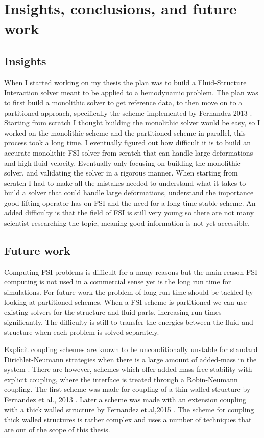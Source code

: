 \chapter{Insights, conclusions, and future work}
\section{Insights}
When I started working on my thesis the plan was to build a Fluid-Structure Interaction solver meant to be applied to a hemodynamic problem. The plan was to first build a monolithic solver to get reference data, to then move on to a partitioned approach, specifically the scheme implemented by Fernandez 2013 \cite{Fernandez2013}. Starting from scratch I thought building the monolithic solver would be easy, so I worked on the monolithic scheme and the partitioned scheme in parallel, this process took a long time. I eventually figured out how difficult it is to build an accurate monolithic FSI solver from scratch that can handle large deformations and high fluid velocity. Eventually only focusing on building the monolithic solver, and validating the solver in a rigorous manner. When starting from scratch I had to make all the mistakes needed to understand what it takes to build a solver that could handle large deformations, understand the importance good lifting operator has on FSI and the need for a long time stable scheme. An added difficulty is that the field of FSI is still very young so there are not many scientist researching the topic, meaning good information is not yet accessible.

\section{Future work}
Computing FSI problems is difficult for a many reasons but the main reason FSI computing is not used in a commercial sense yet is the long run time for simulations. For future work the problem of long run time should be tackled by looking at partitioned schemes. When a FSI scheme is partitioned we can use existing solvers for the structure and fluid parts, increasing run times significantly. The difficulty is still to transfer the energies between the fluid and structure when each problem is solved separately.  

Explicit coupling schemes are known to be unconditionally unstable for standard Dirichlet-Neumann strategies when there is a large amount of added-mass in the system \cite{Fernandez2015, VanBrummelen2009}. There are however, schemes which offer added-mass free stability with explicit coupling, where the interface is treated through a Robin-Neumann coupling. The first scheme was made for coupling of a thin walled structure by Fernandez et al., 2013 \cite{Fernandez2013}. Later a scheme was made with an extension coupling with a thick walled structure by Fernandez et.al,2015 \cite{Fernandez2015}. The scheme for coupling thick walled structures is rather complex and uses a number of techniques that are out of the scope of this thesis. 

